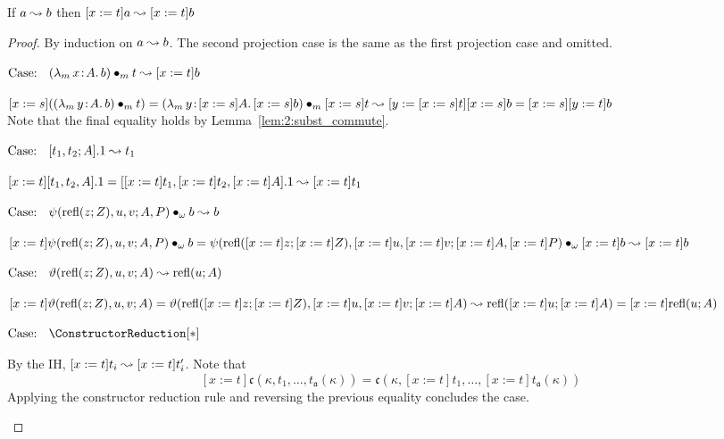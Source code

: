 \begin{lemma}
    If $a \leadsto b$ then $[x := t]a \leadsto [x := t]b$
    \label{lem:2:betared_subst}
\end{lemma}
\begin{proof}
    By induction on $a \leadsto b$.
    The second projection case is the same as the first projection case and omitted.

    $\text{Case: }\begin{array}{c} ({\lambda_m}\, x\! : \! A.\, b) \bullet_{m} t \leadsto [x := t]b \end{array}$
    \begin{proofcase}
        $[x := s](({\lambda_m}\, y\! : \! A.\, b) \bullet_{m} t) = ({\lambda_m}\, y\! : \! [x := s]A.\, [x := s]b) \bullet_{m} [x := s]t \leadsto [y := [x := s]t][x := s]b = [x := s][y := t]b$ \\
        Note that the final equality holds by Lemma~\ref{lem:2:subst_commute}.
    \end{proofcase}

    $\text{Case: }\begin{array}{c} [t_1, t_2; A].1 \leadsto t_1 \end{array}$
    \begin{proofcase}
        $[x := t][t_1, t_2, A].1 = [[x := t]t_1, [x := t]t_2, [x := t]A].1 \leadsto [x := t]t_1$
    \end{proofcase}

    $\text{Case: }\begin{array}{c} \psi(\text{refl}(z; Z), u, v; A, P) \bullet_{\omega} b \leadsto b \end{array}$
    \begin{proofcase}
        $[x := t]\psi(\text{refl}(z; Z), u, v; A, P) \bullet_{\omega} b = \psi(\text{refl}([x := t]z; [x := t]Z), [x := t]u, [x := t]v; [x := t]A, [x := t]P) \bullet_{\omega} [x := t]b \leadsto [x := t]b$
    \end{proofcase}

    $\text{Case: }\begin{array}{c} \vartheta(\text{refl}(z; Z), u, v; A) \leadsto \text{refl}(u; A) \end{array}$
    \begin{proofcase}
        $[x := t]\vartheta(\text{refl}(z; Z), u, v; A) = \vartheta(\text{refl}([x := t]z; [x := t]Z), [x := t]u, [x := t]v; [x := t]A) \leadsto \text{refl}([x := t]u; [x := t]A) = [x := t]\text{refl}(u; A)$
    \end{proofcase}

    $\text{Case: }\begin{array}{c} \ConstructorReduction[*] \end{array}$
    \begin{proofcase}
        By the IH, $[x := t]t_i \leadsto [x := t]t_i^\prime$.
        Note that $$[x := t]\mathfrak{c}(\kappa, t_1, \ldots, t_{\mathfrak{a}}(\kappa)) = \mathfrak{c}(\kappa, [x := t]t_1, \ldots, [x := t]t_{\mathfrak{a}}(\kappa))$$
        Applying the constructor reduction rule and reversing the previous equality concludes the case.
    \end{proofcase}


\end{proof}
